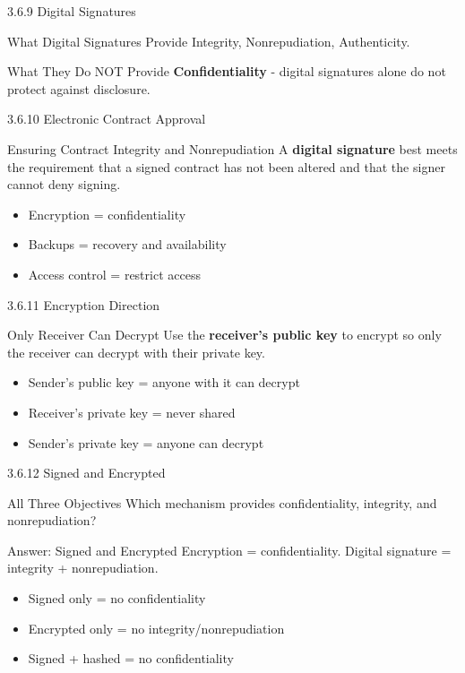 \documentclass{beamer}
\begin{document}
	\begin{frame}{3.6.9 Digital Signatures}
		\begin{block}{What Digital Signatures Provide}
			Integrity, Nonrepudiation, Authenticity.
		\end{block}
		\begin{alertblock}{What They Do NOT Provide}
			\textbf{Confidentiality} - digital signatures alone do not protect against disclosure.
		\end{alertblock}
	\end{frame}
	
	\begin{frame}{3.6.10 Electronic Contract Approval}
		\begin{block}{Ensuring Contract Integrity and Nonrepudiation}
			A \textbf{digital signature} best meets the requirement that a signed contract has not been altered and that the signer cannot deny signing.
		\end{block}
		\begin{itemize}
			\item Encryption = confidentiality
			\item Backups = recovery and availability
			\item Access control = restrict access
		\end{itemize}
	\end{frame}
	
	\begin{frame}{3.6.11 Encryption Direction}
		\begin{block}{Only Receiver Can Decrypt}
			Use the \textbf{receiver's public key} to encrypt so only the receiver can decrypt with their private key.
		\end{block}
		\begin{itemize}
			\item Sender's public key = anyone with it can decrypt
			\item Receiver's private key = never shared
			\item Sender's private key = anyone can decrypt
		\end{itemize}
	\end{frame}
	
	\begin{frame}{3.6.12 Signed and Encrypted}
		\begin{block}{All Three Objectives}
			Which mechanism provides confidentiality, integrity, and nonrepudiation?
		\end{block}
		\begin{exampleblock}{Answer: Signed and Encrypted}
			Encryption = confidentiality. Digital signature = integrity + nonrepudiation.
		\end{exampleblock}
		\begin{itemize}
			\item Signed only = no confidentiality
			\item Encrypted only = no integrity/nonrepudiation
			\item Signed + hashed = no confidentiality
		\end{itemize}
	\end{frame}
	
\end{document}
